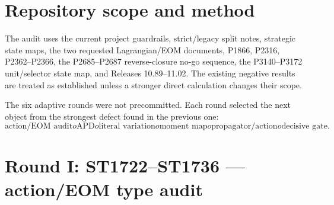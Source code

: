 \documentclass[11pt,a4paper]{article}
\begin{document}
\begin{abstract}
Fourth, the finite strict kernel matrix $W$ is tested as a propagator.  In the
current construction $W=sI-A$.  It cannot equal a normal-ordered resolvent
$a(A+m^2I)^{-1}-cI$ on seven distinct eigenvalues.  Its spectrum has seven
negative and five positive modes, so using $W$ as a Euclidean covariance gives
an indefinite inverse Hessian.  The unavoidable variational object is instead
the positive Dirichlet action
\[
S_A[f;J]=\frac12f^TAf-J^Tf,
\]
whose Green operator is $A^+$ on the mean-zero subspace.  This action unifies
finite Green response, heat, unitary and wave functional calculi but does not
select a physical channel, state category, scale or spacetime interpretation.

The current FIN mathematics therefore survives as a finite Dirichlet--Markov--
spectral information geometry with conditional operational models.  It is not
currently a fundamental physical theory.  The highest-value next theorem is
to derive or refute one globally regular, refinement-compatible,
gauge-covariant source action directly from strict algebra/Dirichlet data,
with every EOM regenerated by literal variation.  A seven-row decisive gate is
provided; the current strict repository passes zero complete rows.
\end{abstract}

\tableofcontents\newpage

\section{Repository scope and method}

The audit uses the current project guardrails, strict/legacy split notes,
strategic state maps, the two requested Lagrangian/EOM documents, P1866,
P2316, P2362--P2366, the P2685--P2687 reverse-closure no-go sequence, the
P3140--P3172 unit/selector state map, and Releases 10.89--11.02.  The existing
negative results are treated as established unless a stronger direct
calculation changes their scope.

The six adaptive rounds were not precommitted.  Each round selected the next
object from the strongest defect found in the previous one:
\[
\text{action/EOM audit}	o\text{APD}	o\text{literal variation}	o
\text{moment map}	o\text{propagator/action}	o\text{decisive gate}.
\]

\section{Round I: ST1722--ST1736 --- action/EOM type audit}
\end{document}
